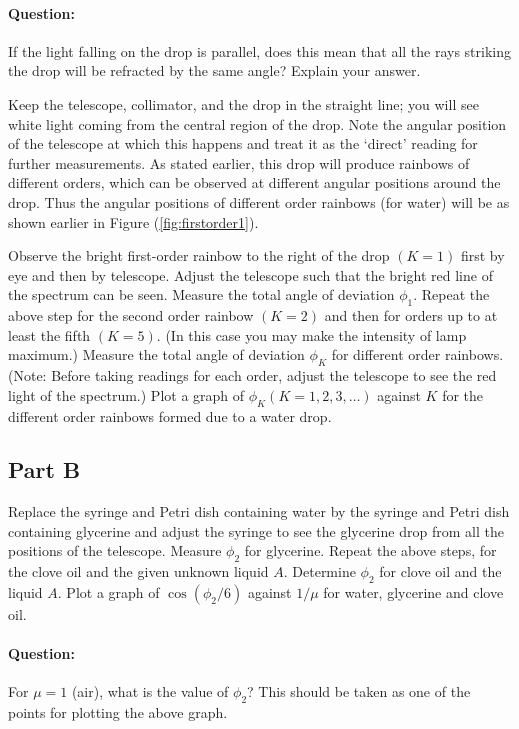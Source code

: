 \begin{question}
\paragraph{Question:} If the light falling on the drop is parallel, does this mean that all the rays striking the drop will be refracted by the same angle? Explain your answer.
\end{question}

Keep the telescope, collimator, and the drop in the straight line; you will see white light coming from the central region of the drop. Note the angular position of the telescope at which this happens and treat it as the `direct' reading for further measurements. As stated earlier, this drop will produce rainbows of different orders, which can be observed at different angular positions around the drop. Thus the angular positions of different order rainbows (for water) will be as shown earlier in Figure (\ref{fig:firstorder1}). 

Observe the bright first-order rainbow to the right of the drop $(K = 1)$ first by eye and then by telescope. Adjust the telescope such that the bright red line of the spectrum can be seen. Measure the total angle of deviation $\phi_1$. Repeat the above step for the second order rainbow $(K = 2)$ and then for orders up to at least the fifth $(K = 5)$. (In this case you may make the intensity of lamp maximum.) Measure the total angle of deviation $\phi_K$ for different order rainbows. (Note: Before taking readings for each order, adjust the telescope to see the red light of the spectrum.) Plot a graph of $\phi_K (K = 1, 2, 3, \hdots)$ against $K$ for the different order rainbows formed due to a water drop.

\subsection*{Part B}
Replace the syringe and Petri dish containing water by the syringe and Petri dish containing glycerine and adjust the syringe to see the glycerine drop from all the positions of the telescope. Measure $\phi_2$ for glycerine. Repeat the above steps, for the clove oil and the given unknown liquid $A$. Determine $\phi_2$ for clove oil and the liquid $A$. Plot a graph of $\cos(\phi_2 / 6)$ against $1/\mu$ for water, glycerine and clove oil. 

\begin{question}
\paragraph{Question:} For $\mu = 1$ (air), what is the value of $\phi_2$? This should be taken as one of the points for plotting the above graph.
\end{question}
 

